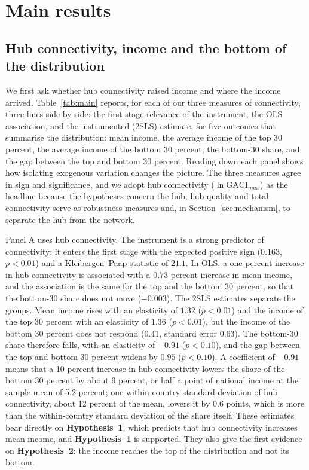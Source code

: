 \section{Main results}
\label{sec:results}
\subsection{Hub connectivity, income and the bottom of the distribution}
\label{sec:headline}
We first ask whether hub connectivity raised income and where the income arrived. Table~\ref{tab:main} reports, for each of our three measures of connectivity, three lines side by side: the first-stage relevance of the instrument, the OLS association, and the instrumented (2SLS) estimate, for five outcomes that summarise the distribution: mean income, the average income of the top 30 percent, the average income of the bottom 30 percent, the bottom-30 share, and the gap between the top and bottom 30 percent. Reading down each panel shows how isolating exogenous variation changes the picture. The three measures agree in sign and significance, and we adopt hub connectivity ($\ln\mathrm{GACI}_{max}$) as the headline because the hypotheses concern the hub; hub quality and total connectivity serve as robustness measures and, in Section~\ref{sec:mechanism}, to separate the hub from the network.



Panel A uses hub connectivity. The instrument is a strong predictor of connectivity: it enters the first stage with the expected positive sign ($0.163$, $p<0.01$) and a Kleibergen--Paap statistic of $21.1$. In OLS, a one percent increase in hub connectivity is associated with a $0.73$ percent increase in mean income, and the association is the same for the top and the bottom 30 percent, so that the bottom-30 share does not move ($-0.003$). The 2SLS estimates separate the groups. Mean income rises with an elasticity of $1.32$ ($p<0.01$) and the income of the top 30 percent with an elasticity of $1.36$ ($p<0.01$), but the income of the bottom 30 percent does not respond ($0.41$, standard error $0.63$). The bottom-30 share therefore falls, with an elasticity of $-0.91$ ($p<0.10$), and the gap between the top and bottom 30 percent widens by $0.95$ ($p<0.10$). A coefficient of $-0.91$ means that a 10 percent increase in hub connectivity lowers the share of the bottom 30 percent by about 9 percent, or half a point of national income at the sample mean of 5.2 percent; one within-country standard deviation of hub connectivity, about 12 percent of the mean, lowers it by 0.6 points, which is more than the within-country standard deviation of the share itself. These estimates bear directly on \textbf{Hypothesis~1}, which predicts that hub connectivity increases mean income, and \textbf{Hypothesis~1} is supported. They also give the first evidence on \textbf{Hypothesis~2}: the income reaches the top of the distribution and not its bottom.

